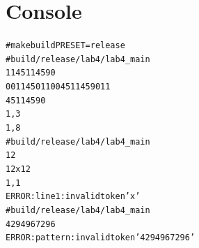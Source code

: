 

\pagebreak

\section{Console}

\begin{alltt}
# make build PRESET=release
# build/release/lab4/lab4_main
11 45 11 45 90
0011 45 011 0045 11 45 90    11
45 11 45 90
1, 3
1, 8
# build/release/lab4/lab4_main
1 2
1 2 x 1 2
1, 1
ERROR: line 1: invalid token 'x'
# build/release/lab4/lab4_main
4294967296
ERROR: pattern: invalid token '4294967296'
\end{alltt}

\pagebreak
